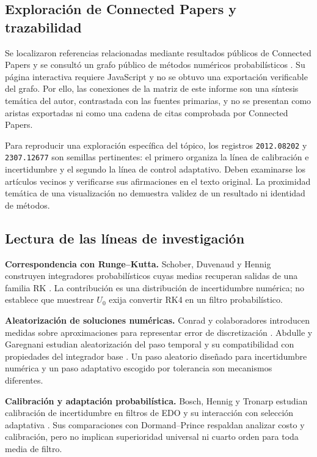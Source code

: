 \documentclass[11pt,a4paper]{article}
\theoremstyle{definition}\newtheorem{definition}[theorem]{Definición}
\theoremstyle{remark}\newtheorem{remark}[theorem]{Observación}
\begin{document}
\subsection{Exploración de Connected Papers y trazabilidad}
Se localizaron referencias relacionadas mediante resultados públicos de
Connected Papers y se consultó un grafo público de métodos numéricos probabilísticos
\cite{connected}. Su página interactiva requiere JavaScript y no se obtuvo
una exportación verificable del grafo. Por ello, las conexiones de la matriz
de este informe son una síntesis temática del autor, contrastada con las
fuentes primarias, y no se presentan como aristas exportadas ni como una
cadena de citas comprobada por Connected Papers.

Para reproducir una exploración específica del tópico, los registros
\texttt{2012.08202} y \texttt{2307.12677} son semillas pertinentes: el primero
organiza la línea de calibración e incertidumbre y el segundo la línea de
control adaptativo. Deben examinarse los artículos vecinos y verificarse
sus afirmaciones en el texto original. La proximidad temática de una
visualización no demuestra validez de un resultado ni identidad de métodos.

\subsection{Lectura de las líneas de investigación}
\textbf{Correspondencia con Runge--Kutta.} Schober, Duvenaud y Hennig
construyen integradores probabilísticos cuyas medias recuperan salidas de
una familia RK \cite{schober}. La contribución es una distribución de
incertidumbre numérica; no establece que muestrear $U_0$ exija convertir RK4
en un filtro probabilístico.

\textbf{Aleatorización de soluciones numéricas.} Conrad y colaboradores
introducen medidas sobre aproximaciones para representar error de
discretización \cite{conrad}. Abdulle y Garegnani estudian aleatorización del
paso temporal y su compatibilidad con propiedades del integrador base
\cite{abdulle}. Un paso aleatorio diseñado para incertidumbre numérica y un
paso adaptativo escogido por tolerancia son mecanismos diferentes.

\textbf{Calibración y adaptación probabilística.} Bosch, Hennig y Tronarp
estudian calibración de incertidumbre en filtros de EDO y su interacción
con selección adaptativa \cite{bosch}. Sus comparaciones con
Dormand--Prince respaldan analizar costo y calibración, pero no implican
superioridad universal ni cuarto orden para toda media de filtro.
\end{document}
